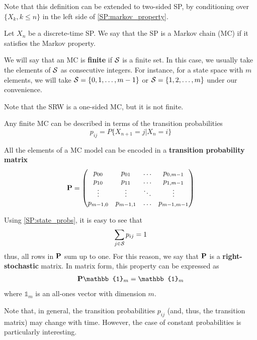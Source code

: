 Note that this definition can be extended to two-sided SP, by conditioning over $\{X_k, k\le n\}$ in the left side of \eqref{SP:markov_property}.

\begin{definition}

Let $X_n$ be a discrete-time SP. We say that the SP is a Markov chain (MC) if it satisfies the Markov property. 

\end{definition}

We will say that an MC is \textbf{finite} if ${\cal S}$ is a finite set. In this case, we usually take the elements of ${\cal S}$ as consecutive integers. For instance, for a state space with $m$ elements, we will take ${\cal S} = \{0, 1, \ldots, m-1\}$ or ${\cal S} = \{1, 2, \ldots, m\}$ under our convenience.

Note that the SRW is a one-sided MC, but it is not finite. 

Any finite MC can be described in terms of the transition probabilities
\begin{equation}
\label{SP:state_probs}
p_{ij} = P\{X_{n+1}=j| X_n=i\}
\end{equation}

All the elements of a MC model can be encoded in a \textbf{transition probability matrix}
\begin{align}
{\bf P} = 
\begin{pmatrix}
p_{00} & p_{01} & \ldots & p_{0,m-1}  \\
p_{10} & p_{11} & \ldots & p_{1,m-1}  \\
\vdots & \vdots & \ddots & \vdots  \\
p_{m-1,0} & p_{m-1,1} & \ldots & p_{m-1,m-1} 
\end{pmatrix}
\end{align}

Using \eqref{SP:state_probs}, it is easy to see that
\begin{align}
\sum_{j \in {\cal S}} p_{ij} = 1
\end{align}
thus, all rows in ${\bf P}$ sum up to one. For this reason, we say that ${\bf P}$ is a \textbf{right-stochastic} matrix. In matrix form, this property can be expressed as
\begin{align}
{\bf P}\mathbb{1}_m = \mathbb{1}_m
\label{sp:psum1}
\end{align}
where $\mathbb{1}_m$ is an all-ones vector with dimension $m$.

Note that, in general, the transition probabilities $p_{ij} $ (and, thus, the transition matrix) may change with time. However, the case of constant probabilities is particularly interesting.

